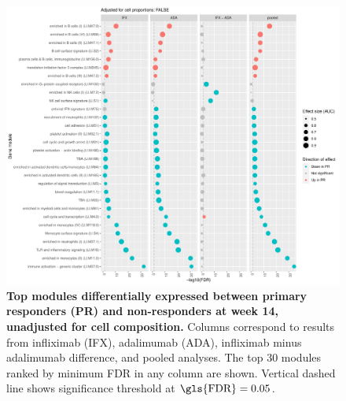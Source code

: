 \begin{figure}
    \centering
    \includegraphics[width=1.0\textwidth,page=1]{mainmatter/figures/chapter_04/plot_gene_set_enrichment.tmodCERNO_panelplot_reversed_C_3RI_3NI,C_3RA_3NA,C_(3RI_3NI)_(3RA_3NA),C_3R_3N.cell_prop_correction_FALSE.pdf}
    \caption{
        \textbf{Top modules differentially expressed between primary responders (PR) and non-responders at week 14, unadjusted for cell composition.}
        Columns correspond to results from infliximab (IFX), adalimumab (ADA), infliximab minus adalimumab difference, and pooled analyses. 
        The top 30 modules ranked by minimum \gls{FDR} in any column are shown. Vertical dashed line shows significance threshold at $\text{\gls{FDR}} = 0.05$.
    }
    \label{fig:multipants_dge_panelPlot_week_14_R_N_cellPropF}
\end{figure}

